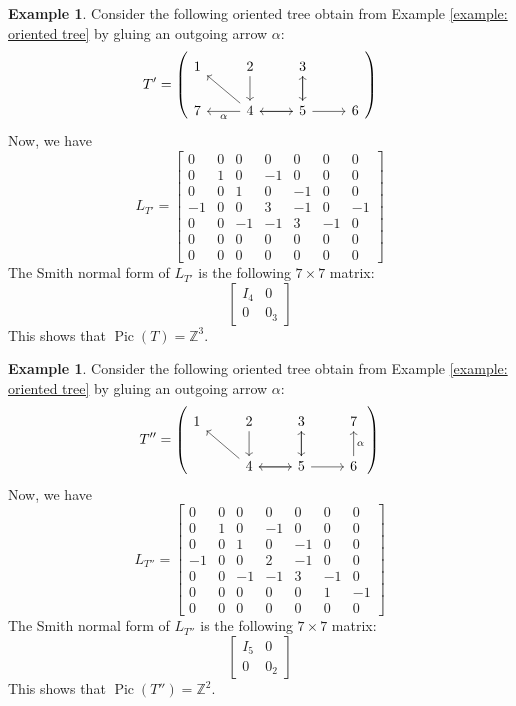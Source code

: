 \documentclass[11pt,reqno]{amsart}
\DeclareMathOperator{\Pic}{Pic}
\theoremstyle{definition}
\newtheorem{myeg}[mydef]{\textbf{Example}}
\theoremstyle{plain}
\begin{document}
\begin{myeg}
Consider the following oriented tree obtain from Example \ref{example: oriented tree} by gluing an outgoing arrow $\alpha$:
\[
T'=\left(\begin{tikzcd}
	1 	& 2 \arrow[d,swap] &  3 \arrow[d] & \\
	7& 4\arrow[r,swap] \arrow[ul] \arrow[l,"\alpha"] & 5 \arrow[l] \arrow[u]\arrow[r,swap] & 6
\end{tikzcd}\right)
\]
Now, we have
\[
L_{T'} = \begin{bmatrix}
	0&0 &0 &0 &0 &0 &0 \\
	0&1 &0 &-1 &0 &0 &0\\
	0& 0& 1&0 &-1 &0 &0\\
	-1& 0& 0& 3&-1 &0 &-1\\
	0&0 &-1 &-1 &3 &-1 &0\\
	0& 0&0 &0 &0 &0 & 0 \\
	0& 0&0 &0 &0 &0 & 0
\end{bmatrix}
\]
The Smith normal form of $L_{T'}$ is the following $7 \times 7$ matrix:
\[
\left[\begin{array}{c|c}
	I_4 & 0 \\ \hline
	0 & 0_3
\end{array}\right]
\]
This shows that $\Pic(T)=\mathbb{Z}^3$.
\end{myeg}

\begin{myeg}
Consider the following oriented tree obtain from Example \ref{example: oriented tree} by gluing an outgoing arrow $\alpha$:
\[
T''=\left(\begin{tikzcd}
	1
	& 2 \arrow[d,swap] &  3 \arrow[d] & 7\\
	& 4\arrow[r,swap] \arrow[ul] & 5 \arrow[l] \arrow[u]\arrow[r,swap] & 6 \arrow[u,swap,"\alpha"]
\end{tikzcd}\right)
\]
Now, we have
\[
L_{T''}=\begin{bmatrix}
	0&0 &0 &0 &0 &0 &0 \\
	0&1 &0 &-1 &0 &0 &0\\
	0& 0& 1&0 &-1 &0 &0\\
	-1& 0& 0& 2&-1 &0 &0\\
	0&0 &-1 &-1 &3 &-1 &0\\
	0& 0&0 &0 &0 &1 & -1 \\
	0& 0&0 &0 &0 &0 & 0
\end{bmatrix}
\]
The Smith normal form of $L_{T''}$ is the following $7 \times 7$ matrix:
\[
\left[\begin{array}{c|c}
	I_5 & 0  \\ \hline
	0 & 0_2
\end{array}\right]
\]
This shows that $\Pic(T'')=\mathbb{Z}^2$.
\end{myeg}
\end{document}
